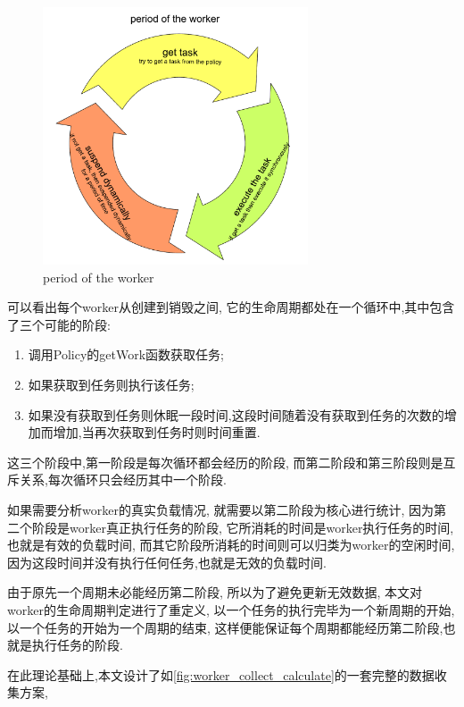 \documentclass{mproj}
\begin{document}
\begin{figure}[h]
    \centering %
    \includegraphics[width=0.7\textwidth]{images/period_of_worker.pdf} %
    \caption{period of the worker} %
    \label{fig:period_of_worker} %
\end{figure}
\FloatBarrier

可以看出每个worker从创建到销毁之间,
它的生命周期都处在一个循环中,其中包含了三个可能的阶段:
\begin{enumerate}
    \item 调用Policy的getWork函数获取任务;
    \item 如果获取到任务则执行该任务;
    \item 如果没有获取到任务则休眠一段时间,这段时间随着没有获取到任务的次数的增加而增加,当再次获取到任务时则时间重置.
\end{enumerate}

这三个阶段中,第一阶段是每次循环都会经历的阶段,
而第二阶段和第三阶段则是互斥关系,每次循环只会经历其中一个阶段.

如果需要分析worker的真实负载情况,
就需要以第二阶段为核心进行统计,
因为第二个阶段是worker真正执行任务的阶段,
它所消耗的时间是worker执行任务的时间,也就是有效的负载时间,
而其它阶段所消耗的时间则可以归类为worker的空闲时间,
因为这段时间并没有执行任何任务,也就是无效的负载时间.

由于原先一个周期未必能经历第二阶段,
所以为了避免更新无效数据,
本文对worker的生命周期判定进行了重定义,
以一个任务的执行完毕为一个新周期的开始,
以一个任务的开始为一个周期的结束,
这样便能保证每个周期都能经历第二阶段,也就是执行任务的阶段.

在此理论基础上,本文设计了如\cref{fig:worker_collect_calculate}的一套完整的数据收集方案,
\end{document}
